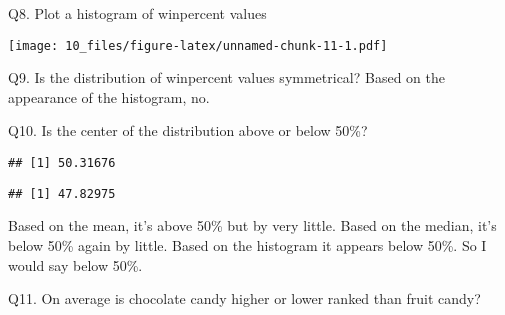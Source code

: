 \documentclass[
]{article}
\newenvironment{Shaded}{\begin{snugshade}}{\end{snugshade}}
\newcommand{\AttributeTok}[1]{\textcolor[rgb]{0.13,0.29,0.53}{#1}}
\newcommand{\CommentTok}[1]{\textcolor[rgb]{0.56,0.35,0.01}{\textit{#1}}}
\newcommand{\FunctionTok}[1]{\textcolor[rgb]{0.13,0.29,0.53}{\textbf{#1}}}
\newcommand{\NormalTok}[1]{#1}
\newcommand{\SpecialCharTok}[1]{\textcolor[rgb]{0.81,0.36,0.00}{\textbf{#1}}}
\newcommand{\StringTok}[1]{\textcolor[rgb]{0.31,0.60,0.02}{#1}}
\begin{document}
Q8. Plot a histogram of winpercent values

\begin{Shaded}
\end{Shaded}

\texttt{[image: 10\_files/figure-latex/unnamed-chunk-11-1.pdf]}

Q9. Is the distribution of winpercent values symmetrical? Based on the
appearance of the histogram, no.

Q10. Is the center of the distribution above or below 50\%?

\begin{Shaded}
\end{Shaded}

\begin{verbatim}
## [1] 50.31676
\end{verbatim}

\begin{Shaded}
\end{Shaded}

\begin{verbatim}
## [1] 47.82975
\end{verbatim}

Based on the mean, it's above 50\% but by very little. Based on the
median, it's below 50\% again by little. Based on the histogram it
appears below 50\%. So I would say below 50\%.

Q11. On average is chocolate candy higher or lower ranked than fruit
candy?

\begin{Shaded}
\end{Shaded}
\end{document}
